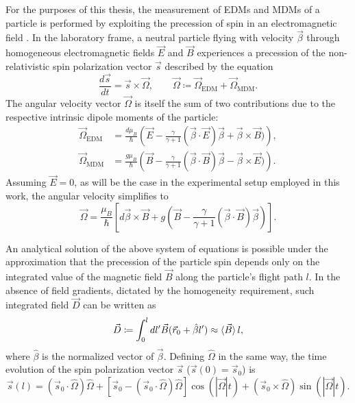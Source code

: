 For the purposes of this thesis, the measurement of EDMs and MDMs of a particle is performed by exploiting the precession of spin in an electromagnetic field \cite{EMDipoleSearch}.
In the laboratory frame, a neutral particle flying with velocity $\vec{\beta}$ through homogeneous electromagnetic fields $\vec{E}$ and $\vec{B}$ experiences a precession of the non-relativistic spin polarization vector $\vec{s}$ described by the equation
\begin{equation}
\frac{d\vec{s}}{dt} = \vec{s} \times \vec{\Omega},
\quad\quad
\vec{\Omega} \coloneqq \vec{\Omega}_\text{EDM} + \vec{\Omega}_\text{MDM}.
\end{equation}
The angular velocity vector $\vec{\Omega}$ is itself the sum of two contributions due to the respective intrinsic dipole moments of the particle:
\begin{align}
\vec{\Omega}_\text{EDM} &= \frac{d\mu_B}{\hbar}
\left(
\vec{E} - \frac{\gamma}{\gamma+1} (\vec{\beta} \cdot \vec{E})\vec{\beta} + \vec{\beta} \times \vec{B})
\right), \\
\vec{\Omega}_\text{MDM} &= \frac{g\mu_B}{\hbar}
\left(
\vec{B} - \frac{\gamma}{\gamma+1} (\vec{\beta} \cdot \vec{B})\vec{\beta} - \vec{\beta} \times \vec{E})
\right).
\end{align}
Assuming $\vec{E} = 0$, as will be the case in the experimental setup employed in this work, the angular velocity simplifies to
\begin{equation}
\vec{\Omega} = \frac{\mu_B}{\hbar}
\left[
	d\vec{\beta} \times \vec{B}
	+
	g\left(
	\vec{B} - \frac{\gamma}{\gamma+1}(\vec{\beta} \cdot \vec{B}) \vec{\beta}
	\right)
\right].
\label{eq:system_spin_precession}
\end{equation}

An analytical solution of the above system of equations is possible under the approximation that the precession of the particle spin depends only on the integrated value of the magnetic field $\vec{B}$ along the particle's flight path $l$.
In the absence of field gradients, dictated by the homogeneity requirement, such integrated field $\vec{D}$ can be written as
\begin{equation}
	\vec{D} \coloneqq \int_0^l dl' \vec{B}(\vec{r}_0 +\hat{\beta} l') \approx \braket{\vec{B}} l,
	\label{eq:integratedD}
\end{equation}
where $\hat{\beta}$ is the normalized vector of $\vec{\beta}$.
Defining $\hat{\Omega}$ in the same way, the time evolution of the spin polarization vector $\vec{s}$ ($\vec{s}(0) = \vec{s}_0$) is
\begin{equation}
	\vec{s} \left(
		l
	\right) =
	\left(
		\vec{s}_0 \cdot \hat{\Omega}
	\right) \hat{\Omega}
	+
	\left[
		\vec{s}_0 - \left(
			\vec{s}_0 \cdot \hat{\Omega}
		\right) \hat{\Omega}
	\right]
	\cos \left(
		\left \lvert
			\vec{\Omega}
		\right\rvert t
	\right)
	+
	\left(
		\vec{s}_0 \times \hat{\Omega}
	\right)
	\sin \left(
		\left \lvert
			\vec{\Omega}
		\right\rvert t
	\right).
\label{eq:spin-precession-t_cap1}
\end{equation}

